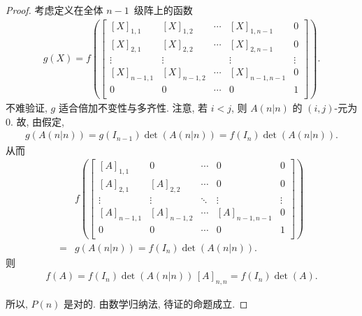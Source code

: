 \documentclass[../libro.tex]{subfiles}
\begin{document}
\begin{proof}
    考虑定义在全体 \(n-1\)~级阵上的函数
    \begin{align*}
        g(X)
        =
        f\left(
            \begin{bmatrix}
                [X]_{1,1}   & [X]_{1,2}   & \cdots & [X]_{1,n-1}   & 0      \\
                [X]_{2,1}   & [X]_{2,2}   & \cdots & [X]_{2,n-1}   & 0      \\
                \vdots      & \vdots      & {}     & \vdots        & \vdots \\
                [X]_{n-1,1} & [X]_{n-1,2} & \cdots & [X]_{n-1,n-1} & 0      \\
                0           & 0           & \cdots & 0             & 1      \\
            \end{bmatrix}
        \right).
    \end{align*}
    不难验证, \(g\) 适合倍加不变性与多齐性.
    注意, 若 \(i < j\),
    则 \(A(n|n)\) 的 \((i, j)\)-元为 \(0\).
    故, 由假定,
    \begin{align*}
        g(A(n|n)) = g(I_{n-1}) \det {(A(n|n))}
        = f(I_n) \det {(A(n|n))}.
    \end{align*}
    从而
    \begin{align*}
        &
        f\left(
            \begin{bmatrix}
                [A]_{1,1}   & 0           & \cdots & 0             & 0      \\
                [A]_{2,1}   & [A]_{2,2}   & \cdots & 0             & 0      \\
                \vdots      & \vdots      & \ddots & \vdots        & \vdots \\
                [A]_{n-1,1} & [A]_{n-1,2} & \cdots & [A]_{n-1,n-1} & 0      \\
                0           & 0           & \cdots & 0             & 1      \\
            \end{bmatrix}
        \right)
        \\
        = {} &
        g(A(n|n)) = f(I_n) \det {(A(n|n))}.
    \end{align*}
    则
    \begin{align*}
        f(A) = f(I_n) \det {(A(n|n))}\,[A]_{n,n}
        = f(I_n) \det {(A)}.
    \end{align*}

    所以, \(P(n)\) 是对的.
    由数学归纳法, 待证的命题成立.
\end{proof}
\end{document}
